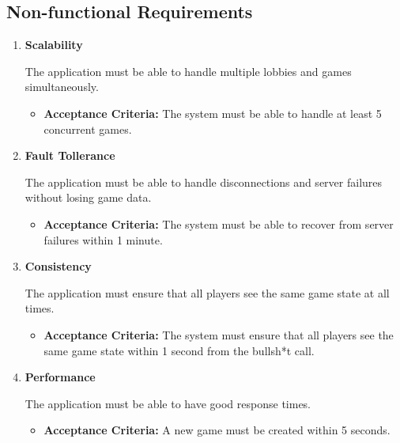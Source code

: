 \documentclass{scrartcl}
\begin{document}
\subsection{Non-functional Requirements}\label{non-functional-requirements}
\begin{enumerate}
  \item \textbf{Scalability}\par
  The application must be able to handle multiple lobbies and games simultaneously.\par
  \begin{itemize}
    \item \textbf{Acceptance Criteria:} The system must be able to handle at least 5 concurrent games.
  \end{itemize}
  
  \item \textbf{Fault Tollerance}\par
  The application must be able to handle disconnections and server failures without losing game data. 
  \begin{itemize}
    \item \textbf{Acceptance Criteria:} The system must be able to recover from server failures within 1 minute.
  \end{itemize}
  \item \textbf{Consistency}\par
  The application must ensure that all players see the same game state at all times.
  \begin{itemize}
    \item \textbf{Acceptance Criteria:} The system must ensure that all players see the same game state within 1 second from the bullsh*t call.
  \end{itemize}
  \item \textbf{Performance}\par
  The application must be able to have good response times.
  \begin{itemize}
    \item \textbf{Acceptance Criteria:} A new game must be created within 5 seconds.
  \end{itemize}
  

\end{enumerate}
\end{document}
